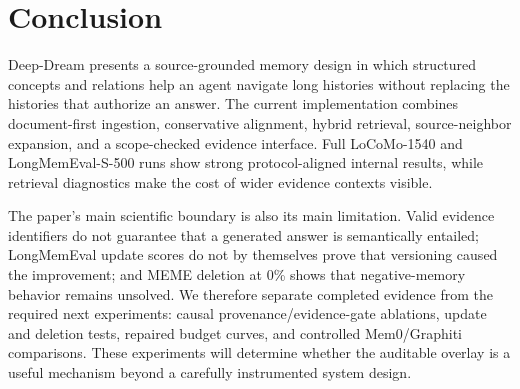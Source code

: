 \section{Conclusion}

Deep-Dream presents a source-grounded memory design in which structured concepts and relations help an agent navigate long histories without replacing the histories that authorize an answer. The current implementation combines document-first ingestion, conservative alignment, hybrid retrieval, source-neighbor expansion, and a scope-checked evidence interface. Full LoCoMo-1540 and LongMemEval-S-500 runs show strong protocol-aligned internal results, while retrieval diagnostics make the cost of wider evidence contexts visible.

The paper's main scientific boundary is also its main limitation. Valid evidence identifiers do not guarantee that a generated answer is semantically entailed; LongMemEval update scores do not by themselves prove that versioning caused the improvement; and MEME deletion at 0\% shows that negative-memory behavior remains unsolved. We therefore separate completed evidence from the required next experiments: causal provenance/evidence-gate ablations, update and deletion tests, repaired budget curves, and controlled Mem0/Graphiti comparisons. These experiments will determine whether the auditable overlay is a useful mechanism beyond a carefully instrumented system design.
